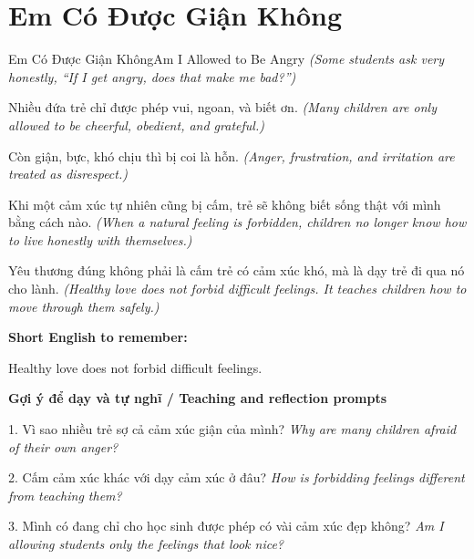 \section{Em Có Được Giận Không}
\begin{truyen}{Em Có Được Giận Không}{Am I Allowed to Be Angry}
\textit{(Some students ask very honestly, “If I get angry, does that make me bad?”)}

Nhiều đứa trẻ chỉ được phép vui, ngoan, và biết ơn.
\textit{(Many children are only allowed to be cheerful, obedient, and grateful.)}

Còn giận, bực, khó chịu thì bị coi là hỗn.
\textit{(Anger, frustration, and irritation are treated as disrespect.)}

Khi một cảm xúc tự nhiên cũng bị cấm, trẻ sẽ không biết sống thật với mình bằng cách nào.
\textit{(When a natural feeling is forbidden, children no longer know how to live honestly with themselves.)}

\end{truyen}

\begin{baihoc}
Yêu thương đúng không phải là cấm trẻ có cảm xúc khó, mà là dạy trẻ đi qua nó cho lành.
\textit{(Healthy love does not forbid difficult feelings. It teaches children how to move through them safely.)}
\end{baihoc}

\begin{ghinhoanh}
\textbf{Short English to remember:}

Healthy love does not forbid difficult feelings.

\end{ghinhoanh}

\begin{tuhocnhanh}
\textbf{Gợi ý để dạy và tự nghĩ / Teaching and reflection prompts}

1. Vì sao nhiều trẻ sợ cả cảm xúc giận của mình? \textit{Why are many children afraid of their own anger?}

2. Cấm cảm xúc khác với dạy cảm xúc ở đâu? \textit{How is forbidding feelings different from teaching them?}

3. Mình có đang chỉ cho học sinh được phép có vài cảm xúc đẹp không? \textit{Am I allowing students only the feelings that look nice?}
\end{tuhocnhanh}
\ngancach

